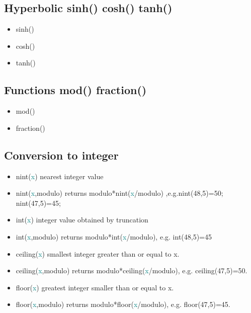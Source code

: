 {\subsection{Hyperbolic  \textcolor{VioletRed}{sinh}() \textcolor{VioletRed}{cosh}() \textcolor{VioletRed}{tanh}()} 
\label{hyper} 
\begin{itemize} 
\item \textcolor{VioletRed}{sinh}() 
\item \textcolor{VioletRed}{cosh}() 
\item \textcolor{VioletRed}{tanh}() 
\end{itemize} 
\subsection{Functions \textcolor{VioletRed}{mod}() \textcolor{VioletRed}{fraction}()} 
\label{mod} 
\begin{itemize} 
\item \textcolor{VioletRed}{mod}() 
\item \textcolor{VioletRed}{fraction}() 
\end{itemize} 
\subsection{Conversion to integer} 
\label{conversion} 
 
\begin{itemize} 
\item \textcolor{VioletRed}{nint}(\textcolor{teal}{x}) nearest integer value 
\item \textcolor{VioletRed}{nint}(\textcolor{teal}{x},modulo) returns modulo*\textcolor{VioletRed}{nint}(\textcolor{teal}{x}/modulo) ,e.g.\textcolor{VioletRed}{nint}(48,5)=50; \textcolor{VioletRed}{nint}(47,5)=45; 
\item \textcolor{VioletRed}{int}(\textcolor{teal}{x}) integer value obtained by truncation 
\item \textcolor{VioletRed}{int}(\textcolor{teal}{x},modulo) returns modulo*\textcolor{VioletRed}{int}(\textcolor{teal}{x}/modulo), e.g. \textcolor{VioletRed}{int}(48,5)=45 
\item \textcolor{VioletRed}{ceiling}(\textcolor{teal}{x}) smallest integer greater than or equal to {x}. 
\item \textcolor{VioletRed}{ceiling}(\textcolor{teal}{x},modulo) returns modulo*\textcolor{VioletRed}{ceiling}(\textcolor{teal}{x}/modulo), e.g. \textcolor{VioletRed}{ceiling}(47,5)=50. 
\item \textcolor{VioletRed}{floor}(\textcolor{teal}{x}) greatest integer smaller than or equal to {x}. 
\item \textcolor{VioletRed}{floor}(\textcolor{teal}{x},modulo) returns modulo*\textcolor{VioletRed}{floor}(\textcolor{teal}{x}/modulo), e.g. \textcolor{VioletRed}{floor}(47,5)=45. 
\end{itemize} 
}
